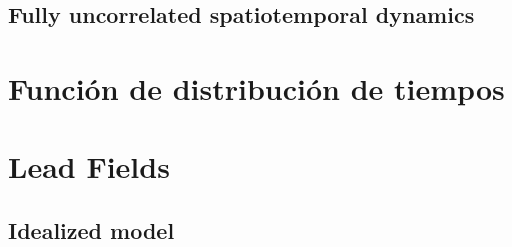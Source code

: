 \subsection{Fully uncorrelated spatiotemporal dynamics}

%
%
\section{Función de distribución de tiempos}

\section{Lead Fields}

\subsection{Idealized model}

